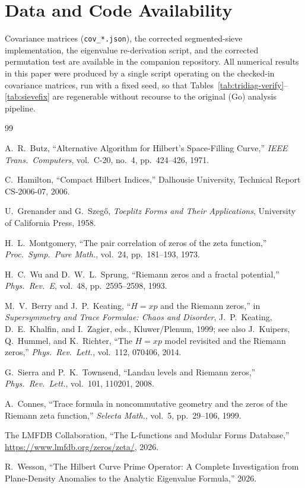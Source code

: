 \documentclass[11pt,a4paper]{article}
\begin{document}
\section*{Data and Code Availability}
Covariance matrices (\texttt{cov\_*.json}), the corrected segmented-sieve
implementation, the eigenvalue re-derivation script, and the corrected
permutation test are available in the companion repository. All numerical
results in this paper were produced by a single script operating on the
checked-in covariance matrices, run with a fixed seed, so that
Tables~\ref{tab:tridiag-verify}--\ref{tab:sievefix} are regenerable without
recourse to the original (Go) analysis pipeline.

\begin{thebibliography}{99}

A.~R.~Butz, ``Alternative Algorithm for Hilbert's Space-Filling Curve,''
\emph{IEEE Trans.\ Computers}, vol.~C-20, no.~4, pp.~424--426, 1971.

C.~Hamilton, ``Compact Hilbert Indices,'' Dalhousie University, Technical
Report CS-2006-07, 2006.

U.~Grenander and G.~Szeg\H{o}, \emph{Toeplitz Forms and Their
Applications}, University of California Press, 1958.

H.~L.~Montgomery, ``The pair correlation of zeros of the zeta function,''
\emph{Proc.\ Symp.\ Pure Math.}, vol.~24, pp.~181--193, 1973.

H.~C.~Wu and D.~W.~L.~Sprung, ``Riemann zeros and a fractal potential,''
\emph{Phys.\ Rev.\ E}, vol.~48, pp.~2595--2598, 1993.

M.~V.~Berry and J.~P.~Keating, ``$H=xp$ and the Riemann zeros,'' in
\emph{Supersymmetry and Trace Formulae: Chaos and Disorder}, J.~P.~Keating,
D.~E.~Khalfin, and I.~Zagier, eds., Kluwer/Plenum, 1999; see also
J.~Kuipers, Q.~Hummel, and K.~Richter, ``The $H=xp$ model revisited and the
Riemann zeros,'' \emph{Phys.\ Rev.\ Lett.}, vol.~112, 070406, 2014.

G.~Sierra and P.~K.~Townsend, ``Landau levels and Riemann zeros,''
\emph{Phys.\ Rev.\ Lett.}, vol.~101, 110201, 2008.

A.~Connes, ``Trace formula in noncommutative geometry and the zeros of the
Riemann zeta function,'' \emph{Selecta Math.}, vol.~5, pp.~29--106, 1999.

The LMFDB Collaboration, ``The L-functions and Modular Forms Database,''
\url{https://www.lmfdb.org/zeros/zeta/}, 2026.

R.~Wesson, ``The Hilbert Curve Prime Operator: A Complete Investigation
from Plane-Density Anomalies to the Analytic Eigenvalue Formula,'' 2026.

\end{thebibliography}
\end{document}

